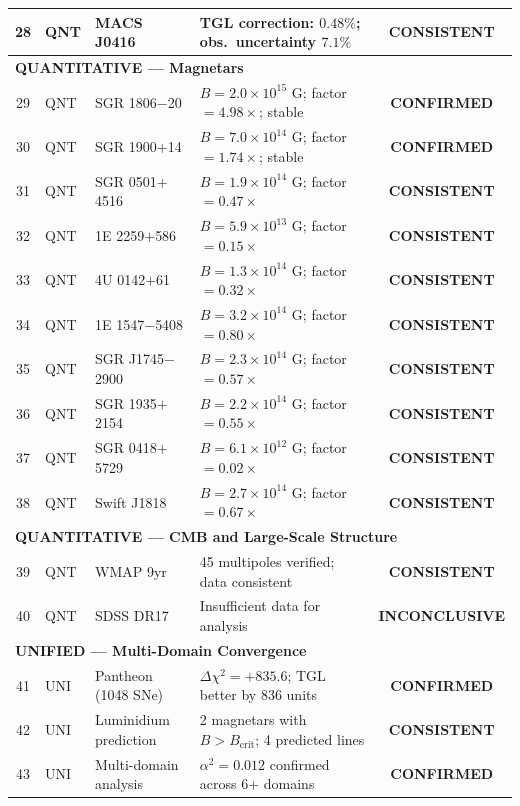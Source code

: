 \documentclass[12pt,a4paper,twoside]{article}
\newcommand{\alphaii}{\alpha^{2}}
\newcommand{\confirmed}{\textcolor{tglgreen}{\textbf{CONFIRMED}}}
\newcommand{\consistent}{\textcolor{tglblue}{\textbf{CONSISTENT}}}
\newcommand{\inconclusive}{\textcolor{tglgray}{\textbf{INCONCLUSIVE}}}
\begin{document}
\begin{small}
\begin{longtable}{clp{3.5cm}p{4.5cm}c}
28 & QNT & MACS J0416            & TGL correction: $0.48\%$; obs.\ uncertainty $7.1\%$  & \consistent \\
%
\midrule
\multicolumn{5}{l}{\textbf{QUANTITATIVE --- Magnetars}} \\
\midrule
29 & QNT & SGR 1806$-$20         & $B = 2.0 \times 10^{15}$ G; factor $= 4.98\times$; stable & \confirmed \\
30 & QNT & SGR 1900$+$14         & $B = 7.0 \times 10^{14}$ G; factor $= 1.74\times$; stable & \confirmed \\
31 & QNT & SGR 0501$+$4516       & $B = 1.9 \times 10^{14}$ G; factor $= 0.47\times$           & \consistent \\
32 & QNT & 1E 2259$+$586         & $B = 5.9 \times 10^{13}$ G; factor $= 0.15\times$           & \consistent \\
33 & QNT & 4U 0142$+$61          & $B = 1.3 \times 10^{14}$ G; factor $= 0.32\times$           & \consistent \\
34 & QNT & 1E 1547$-$5408        & $B = 3.2 \times 10^{14}$ G; factor $= 0.80\times$           & \consistent \\
35 & QNT & SGR J1745$-$2900      & $B = 2.3 \times 10^{14}$ G; factor $= 0.57\times$           & \consistent \\
36 & QNT & SGR 1935$+$2154       & $B = 2.2 \times 10^{14}$ G; factor $= 0.55\times$           & \consistent \\
37 & QNT & SGR 0418$+$5729       & $B = 6.1 \times 10^{12}$ G; factor $= 0.02\times$           & \consistent \\
38 & QNT & Swift J1818            & $B = 2.7 \times 10^{14}$ G; factor $= 0.67\times$           & \consistent \\
%
\midrule
\multicolumn{5}{l}{\textbf{QUANTITATIVE --- CMB and Large-Scale Structure}} \\
\midrule
39 & QNT & WMAP 9yr              & 45 multipoles verified; data consistent                  & \consistent \\
40 & QNT & SDSS DR17             & Insufficient data for analysis                              & \inconclusive \\
%
\midrule
\multicolumn{5}{l}{\textbf{UNIFIED --- Multi-Domain Convergence}} \\
\midrule
41 & UNI & Pantheon (1048 SNe)   & $\Delta\chi^2 = +835.6$; TGL better by 836 units          & \confirmed \\
42 & UNI & Luminidium prediction & 2 magnetars with $B > B_{\text{crit}}$; 4 predicted lines  & \consistent \\
43 & UNI & Multi-domain analysis & $\alphaii = 0.012$ confirmed across 6+ domains               & \confirmed \\
\end{longtable}
\end{small}
\end{document}
